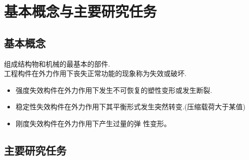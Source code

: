 \section{基本概念与主要研究任务}
\subsection{基本概念}
\vspace{1em}
组成结构物和机械的最基本的部件.\\[0.5em]
工程构件在外力作用下丧失正常功能的现象称为失效或破坏.
\begin{itemize}
	\item 强度失效\quad 构件在外力作用下发生不可恢复的塑性变形或发生断裂.
	\item 稳定性失效\quad 构件在外力作用下其平衡形式发生突然转变.(压缩载荷大于某值)
	\item 刚度失效\quad 构件在外力作用下产生过量的弹
	性变形。
	
\end{itemize}

\subsection{主要研究任务}

